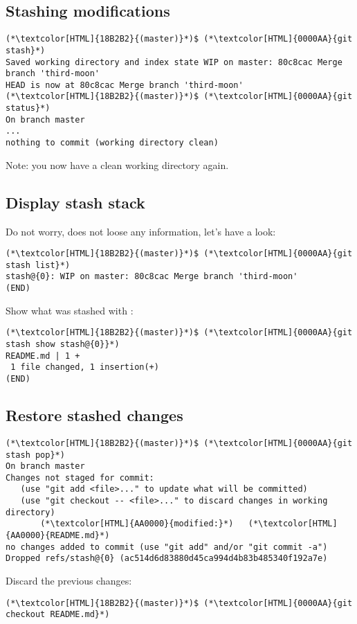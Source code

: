 \subsection{Stashing modifications}
\begin{frame}[fragile]
  \subslidetitle

  \begin{lstlisting}
(*\textcolor[HTML]{18B2B2}{(master)}*)$ (*\textcolor[HTML]{0000AA}{git stash}*)
Saved working directory and index state WIP on master: 80c8cac Merge branch 'third-moon'
HEAD is now at 80c8cac Merge branch 'third-moon'
(*\textcolor[HTML]{18B2B2}{(master)}*)$ (*\textcolor[HTML]{0000AA}{git status}*)
On branch master
...
nothing to commit (working directory clean)
\end{lstlisting}
  Note: you now have a clean working directory again.
\end{frame}

\subsection{Display stash stack}
\begin{frame}[fragile]
  \subslidetitle
  Do not worry,  does not loose any information, let's have a look:

  \begin{lstlisting}
(*\textcolor[HTML]{18B2B2}{(master)}*)$ (*\textcolor[HTML]{0000AA}{git stash list}*)
stash@{0}: WIP on master: 80c8cac Merge branch 'third-moon'
(END)
\end{lstlisting}
  Show what was stashed with :
  \begin{lstlisting}
(*\textcolor[HTML]{18B2B2}{(master)}*)$ (*\textcolor[HTML]{0000AA}{git stash show stash@{0}}*)
README.md | 1 +
 1 file changed, 1 insertion(+)
(END)
\end{lstlisting}

\end{frame}

\subsection{Restore stashed changes}
\begin{frame}[fragile]
  \subslidetitle

  \begin{lstlisting}
(*\textcolor[HTML]{18B2B2}{(master)}*)$ (*\textcolor[HTML]{0000AA}{git stash pop}*)
On branch master
Changes not staged for commit:
   (use "git add <file>..." to update what will be committed)
   (use "git checkout -- <file>..." to discard changes in working directory)
       (*\textcolor[HTML]{AA0000}{modified:}*)   (*\textcolor[HTML]{AA0000}{README.md}*)
no changes added to commit (use "git add" and/or "git commit -a")
Dropped refs/stash@{0} (ac514d6d83880d45ca994d4b83b485340f192a7e)
\end{lstlisting}
  Discard the previous changes:
  \begin{lstlisting}
(*\textcolor[HTML]{18B2B2}{(master)}*)$ (*\textcolor[HTML]{0000AA}{git checkout README.md}*)
\end{lstlisting}
\end{frame}

